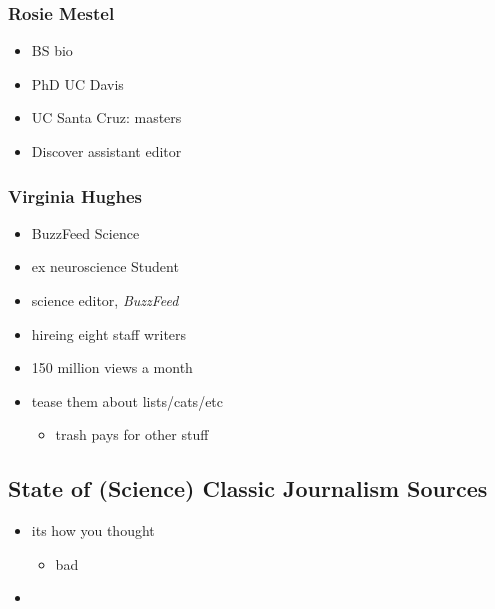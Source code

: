 \documentclass[letterpaper]{scrartcl}
\begin{document}
\subsubsection{Rosie Mestel}\label{rosie-mestel}

\begin{itemize}
\itemsep1pt\parskip0pt
\item
  BS bio
\item
  PhD UC Davis
\item
  UC Santa Cruz: masters
\item
  Discover assistant editor
\end{itemize}

\subsubsection{Virginia Hughes}\label{virginia-hughes}

\begin{itemize}
\itemsep1pt\parskip0pt
\item
  BuzzFeed Science
\item
  ex neuroscience Student
\item
  science editor, \emph{BuzzFeed}
\item
  hireing eight staff writers
\item
  150 million views a month
\item
  tease them about lists/cats/etc

  \begin{itemize}
  \itemsep1pt\parskip0pt
  \item
    trash pays for other stuff
  \end{itemize}
\end{itemize}

\subsection{State of (Science) Classic Journalism
Sources}\label{state-of-science-classic-journalism-sources}

\begin{itemize}
\item
  its how you thought

  \begin{itemize}
  \itemsep1pt\parskip0pt
  \item
    bad
  \end{itemize}
\item
\end{itemize}
\end{document}
